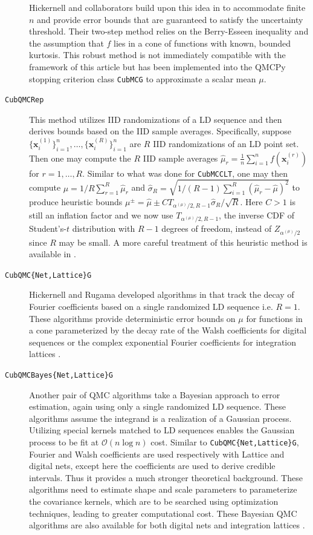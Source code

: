 \documentclass[graybox]{svmult}
\begin{document}
\begin{description}
    Hickernell and collaborators build upon this idea in \cite{cubmcg} to accommodate  finite $n$ and provide error bounds that are guaranteed to satisfy the uncertainty threshold. Their two-step method relies on the Berry-Esseen inequality and the assumption that $f$ lies in a cone of functions with known, bounded kurtosis. This robust method is not immediately compatible with the framework of this article but has been implemented into the QMCPy stopping criterion class \texttt{CubMCG} to approximate a scalar mean $\mu$.
    \item[\texttt{CubQMCRep}] This method utilizes IID randomizations of a LD sequence and then derives bounds based on the IID sample averages. Specifically, suppose $\{\boldsymbol{x}_i^{(1)}\}_{i=1}^n,\dots,\{\boldsymbol{x}_i^{(R)}\}_{i=1}^n$ are $R$ IID randomizations of an LD point set. Then one may compute the $R$ IID sample averages $\hat{\mu}_r = \frac{1}{n} \sum_{i=1}^n f(\boldsymbol{x}_i^{(r)})$ for $r = 1,\dots,R$. Similar to what was done for \texttt{CubMCCLT}, one may then compute $\hat{\mu} = 1/R \sum_{r=1}^R \hat{\mu}_r$ and $\hat{\sigma}_R = \sqrt{1/(R-1)\sum_{i=1}^R(\hat{\mu}_r - \hat{\mu})^2}$ to produce heuristic bounds $\mu^\pm = \hat{\mu} \pm C T_{\alpha^{(\mu)}/2,R-1} \hat{\sigma}_R / \sqrt{R}$. Here $C>1$ is still an inflation factor and we now use $T_{\alpha^{(\mu)}/2,R-1}$, the inverse CDF of Student's-$t$ distribution with $R-1$ degrees of freedom, instead of $Z_{\alpha^{(\mu)}/2}$ since $R$ may be small.
    A more careful treatment of this heuristic method is available in \cite[Chapter 17]{mcbook}. 
    \item[\texttt{CubQMC\{Net,Lattice\}G}] Hickernell and Rugama developed algorithms in \cite{adaptive_qmc} that track the decay of Fourier coefficients based on a single randomized LD sequence i.e. $R=1$. These algorithms provide deterministic error bounds on $\mu$ for functions in a cone parameterized by the decay rate of the Walsh coefficients for digital sequences \cite{cubqmcsobol} or the complex exponential Fourier coefficients for integration lattices \cite{cubqmclattice}. 
    \item[\texttt{CubQMCBayes\{Net,Lattice\}G}] Another pair of QMC algorithms take a Bayesian approach to error estimation, again using only a single randomized LD sequence. These algorithms assume the integrand is a realization of a Gaussian process. Utilizing special kernels matched to LD sequences enables the Gaussian process to be fit at $\mathcal{O}(n \log n)$ cost. Similar to \texttt{CubQMC\{Net,Lattice\}G}, Fourier and Walsh coefficients are used respectively with Lattice and digital nets, except here the coefficients are used to derive credible intervals. Thus it provides a much stronger theoretical background. These algorithms need to estimate shape and scale parameters to parameterize the covariance kernels, which are to be searched using optimization techniques, leading to greater computational cost. These Bayesian QMC algorithms \cite{cubqmcbayes_thesis} are also available for both digital nets \cite{cubqmcbayessobol} and integration lattices  \cite{cubqmcbayeslattice}. 
\end{description}
\end{document}
